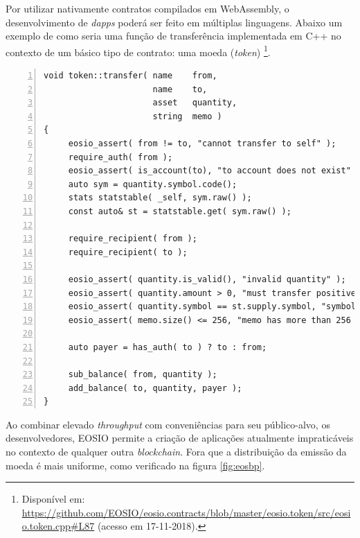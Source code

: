 \documentclass[a4paper,12pt]{monografia}
\theoremstyle{plain}
\theoremstyle{definition}
\theoremstyle{remark}
\begin{document}
Por utilizar nativamente contratos compilados em WebAssembly, o desenvolvimento de \textit{dapps} poder\'{a} ser feito em m\'{u}ltiplas linguagens.
Abaixo um exemplo de como seria uma fun\c{c}\~{a}o de transfer\^{e}ncia implementada em C++ no contexto de um b\'{a}sico tipo de contrato: uma moeda (\textit{token}) \footnote{Dispon\'{i}vel em: \url{https://github.com/EOSIO/eosio.contracts/blob/master/eosio.token/src/eosio.token.cpp#L87} (acesso em 17-11-2018).}.

\lstset{tabsize=5,language=C++,showstringspaces=false,basicstyle=\ttfamily\small,keywordstyle=\bf,breaklines=true}
\begin{singlespacing}
\begin{lstlisting}[frame=single,framexrightmargin=1pt,numbers=left]
void token::transfer( name    from,
                      name    to,
                      asset   quantity,
                      string  memo )
{
     eosio_assert( from != to, "cannot transfer to self" );
     require_auth( from );
     eosio_assert( is_account(to), "to account does not exist" );
     auto sym = quantity.symbol.code();
     stats statstable( _self, sym.raw() );
     const auto& st = statstable.get( sym.raw() );

     require_recipient( from );
     require_recipient( to );

     eosio_assert( quantity.is_valid(), "invalid quantity" );
     eosio_assert( quantity.amount > 0, "must transfer positive quantity" );
     eosio_assert( quantity.symbol == st.supply.symbol, "symbol precision mismatch" );
     eosio_assert( memo.size() <= 256, "memo has more than 256 bytes" );

     auto payer = has_auth( to ) ? to : from;

     sub_balance( from, quantity );
     add_balance( to, quantity, payer );
}

\end{lstlisting}
\end{singlespacing}

Ao combinar elevado \textit{throughput} com conveni\^{e}ncias para seu p\'{u}blico-alvo, os desenvolvedores, EOSIO permite a cria\c{c}\~{a}o de aplica\c{c}\~{o}es atualmente impratic\'{a}veis no contexto de qualquer outra \textit{blockchain}.
Fora que a distribui\c{c}\~ao da emiss\~ao da moeda \'e mais uniforme, como verificado na figura \ref{fig:eosbp}.
\end{document}
